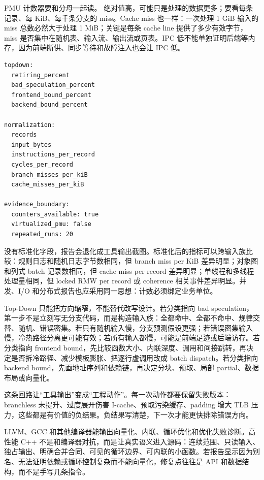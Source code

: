 PMU 计数器要和分母一起读。 绝对值高，可能只是处理的数据更多；要看每条记录、每 KiB、每千条分支的 miss。Cache miss 也一样：一次处理 1 GiB 输入的 miss 总数必然大于处理 1 MiB；关键是每条 cache line 提供了多少有效字节，miss 是否集中在随机表、输入流、输出流或页表。IPC 低不能单独证明后端等内存，因为前端断供、同步等待和故障注入也会让 IPC 低。

\begin{lstlisting}[numbers=none,caption={HotKernelReport 中的 Top-Down 摘要字段}]
topdown:
  retiring_percent
  bad_speculation_percent
  frontend_bound_percent
  backend_bound_percent

normalization:
  records
  input_bytes
  instructions_per_record
  cycles_per_record
  branch_misses_per_kiB
  cache_misses_per_kiB

evidence_boundary:
  counters_available: true
  virtualized_pmu: false
  repeated_runs: 20
\end{lstlisting}

没有标准化字段，报告会退化成工具输出截图。标准化后的指标可以跨输入族比较：规则日志和随机日志字节数相同，但 branch miss per KiB 差异明显；对象图和列式 batch 记录数相同，但 cache miss per record 差异明显；单线程和多线程处理量相同，但 locked RMW per record 或 coherence 相关事件差异明显。并发、I/O 和分布式报告也应采用同一思想：计数必须绑定业务单位。

Top-Down 只能把方向缩窄，不能替代改写设计。若分类指向 bad speculation，第一步不是立刻写无分支代码，而是构造输入族：全都命中、全都不命中、规律交替、随机、错误密集。若只有随机输入慢，分支预测假设更强；若错误密集输入慢，冷热路径分离更可能有效；若所有输入都慢，可能是前端足迹或后端访存。若分类指向 frontend bound，先比较函数大小、内联深度、调用和间接跳转，再决定是否拆冷路径、减少模板膨胀、把逐行虚调用改成 batch dispatch。若分类指向 backend bound，先画地址序列和依赖链，再决定分块、预取、局部 partial、数据布局或向量化。

这条回路让“工具输出”变成“工程动作”。每一次动作都要保留失败版本：branchless 未提升、过度展开伤害 I-cache、预取污染缓存、padding 增大 TLB 压力，这些都是有价值的负结果。负结果写清楚，下一次才能更快排除错误方向。

LLVM、GCC 和其他编译器能输出向量化、内联、循环优化和优化失败诊断。高性能 C++ 不是和编译器对抗，而是让真实语义进入源码：连续范围、只读输入、独占输出、明确合并合同、可见的循环边界、可内联的小函数。若报告显示因为别名、无法证明依赖或循环控制复杂而不能向量化，修复点往往是 API 和数据结构，而不是手写几条指令。

